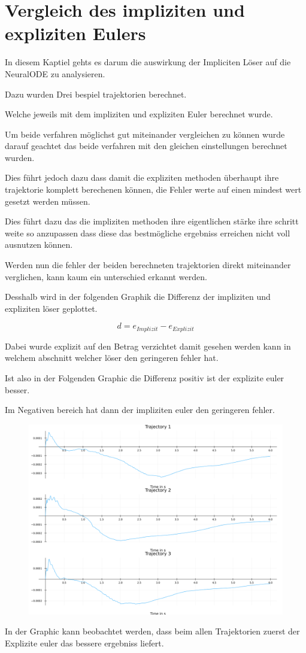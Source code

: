 
\section{Vergleich des impliziten und expliziten Eulers}

In diesem Kaptiel gehts es darum die auswirkung der Impliciten Löser auf die NeuralODE zu analysieren.

Dazu wurden Drei bespiel trajektorien berechnet.

Welche jeweils mit dem impliziten und expliziten Euler berechnet wurde.

Um beide verfahren möglichst gut miteinander vergleichen zu können wurde darauf geachtet das beide verfahren mit den gleichen einstellungen berechnet wurden.

Dies führt jedoch dazu dass damit die expliziten methoden
überhaupt ihre trajektorie komplett berechenen können, 
die Fehler werte auf einen mindest wert gesetzt werden müssen.

Dies führt dazu das die impliziten methoden ihre eigentlichen stärke ihre schritt weite so anzupassen 
dass diese das bestmögliche ergebniss erreichen nicht 
voll ausnutzen können.

Werden nun die fehler der beiden berechneten trajektorien
direkt miteinander verglichen, kann kaum ein unterschied erkannt werden.

Desshalb wird in der folgenden Graphik
die Differenz der impliziten und expliziten löser geplottet.

$$
d = e_{Implizit} - e_{Explizit}
$$

Dabei wurde explizit auf den Betrag verzichtet damit gesehen werden kann in welchem abschnitt welcher löser den geringeren fehler hat.

Ist also in der Folgenden Graphic die Differenz positiv 
ist der explizite euler besser.

Im Negativen bereich hat dann der impliziten euler den geringeren fehler.

\begin{figure}
\includegraphics[width=\textwidth]{Data/03_Ergebnisse/errors.png}
\label{fig:eulervergleich}
\end{figure}
In der Graphic kann beobachtet werden, dass beim allen Trajektorien zuerst der Explizite euler das bessere ergebniss liefert.

